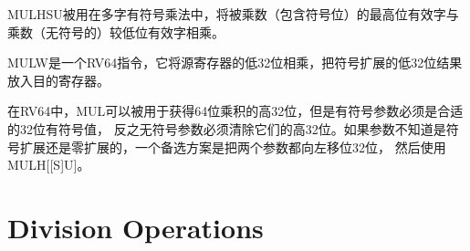 
\begin{commentary}
  MULHSU被用在多字有符号乘法中，将被乘数（包含符号位）的最高位有效字与乘数（无符号的）较低位有效字相乘。
\end{commentary}

MULW是一个RV64指令，它将源寄存器的低32位相乘，把符号扩展的低32位结果放入目的寄存器。

\begin{commentary}
  在RV64中，MUL可以被用于获得64位乘积的高32位，但是有符号参数必须是合适的32位有符号值，
  反之无符号参数必须清除它们的高32位。如果参数不知道是符号扩展还是零扩展的，一个备选方案是把两个参数都向左移位32位，
  然后使用MULH[[S]U]。
\end{commentary}

\section{Division Operations}

